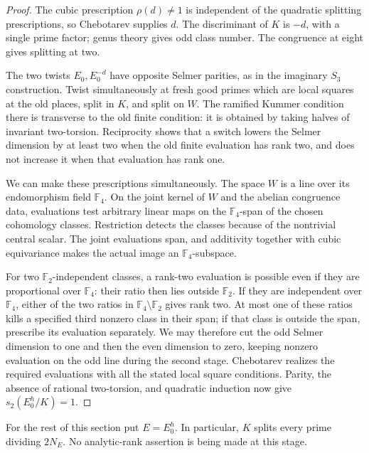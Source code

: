 \begin{proof}
The cubic prescription \(\rho(d)\ne1\) is independent of the
quadratic splitting prescriptions, so Chebotarev supplies \(d\).
The discriminant of \(K\) is \(-d\), with a single prime factor;
genus theory gives odd class number.  The congruence at eight gives
splitting at two.

The two twists \(E_0,E_0^{-d}\) have opposite Selmer parities, as in
the imaginary \(S_3\) construction.  Twist simultaneously at fresh
good primes which are local squares at the old places, split in
\(K\), and split on \(W\).  The ramified Kummer condition there is
transverse to the old finite condition: it is obtained by taking halves
of invariant two-torsion.  Reciprocity shows that a switch lowers the
Selmer dimension by at least two when the old finite evaluation has
rank two, and does not increase it when that evaluation has rank one.

We can make these prescriptions simultaneously.  The space \(W\) is a
line over its endomorphism field \(\mathbb F_4\).  On the joint kernel
of \(W\) and the abelian congruence data, evaluations test arbitrary
linear maps on the \(\mathbb F_4\)-span of the chosen cohomology
classes.  Restriction detects the classes because of the nontrivial
central scalar.  The joint evaluations span, and additivity together
with cubic equivariance makes the actual image an
\(\mathbb F_4\)-subspace.

For two \(\mathbb F_2\)-independent classes, a rank-two evaluation is
possible even if they are proportional over \(\mathbb F_4\): their
ratio then lies outside \(\mathbb F_2\).  If they are independent over
\(\mathbb F_4\), either of the two ratios in
\(\mathbb F_4\setminus\mathbb F_2\) gives rank two.  At most one of
these ratios kills a specified third nonzero class in their span; if
that class is outside the span, prescribe its evaluation separately.
We may therefore cut the odd Selmer dimension to one and then the even
dimension to zero, keeping nonzero evaluation on the odd line during
the second stage.  Chebotarev realizes the required evaluations with
all the stated local square conditions.  Parity, the absence of
rational two-torsion, and quadratic induction now give
\(s_2(E_0^h/K)=1\).
\end{proof}

For the rest of this section put \(E=E_0^h\).  In particular, \(K\)
splits every prime dividing \(2N_E\).  No analytic-rank assertion is
being made at this stage.

